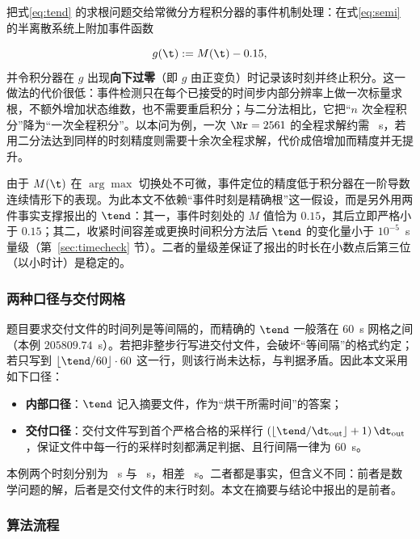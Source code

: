 把式\eqref{eq:tend} 的求根问题交给常微分方程积分器的事件机制处理：在式\eqref{eq:semi} 的半离散系统上附加事件函数

\begin{equation}
g(\t):=M(\t)-0.15,
\label{eq:event}
\end{equation}
并令积分器在 $g$ 出现\textbf{向下过零}（即 $g$ 由正变负）时记录该时刻并终止积分。这一做法的代价很低：事件检测只在每个已接受的时间步内部分辨率上做一次标量求根，不额外增加状态维数，也不需要重启积分；与二分法相比，它把``$n$ 次全程积分''降为``一次全程积分''。以本问为例，一次 $\Nr=2561$ 的全程求解约需 \QThreeWallS~s，若用二分法达到同样的时刻精度则需要十余次全程求解，代价成倍增加而精度并无提升。

由于 $M(\t)$ 在 $\arg\max$ 切换处不可微，事件定位的精度低于积分器在一阶导数连续情形下的表现。为此本文不依赖``事件时刻是精确根''这一假设，而是另外用两件事实支撑报出的 $\tend$：其一，事件时刻处的 $M$ 值恰为 $0.15$，其后立即严格小于 $0.15$；其二，收紧时间容差或更换时间积分方法后 $\tend$ 的变化量小于 $10^{-5}$~s 量级（第~\ref{sec:timecheck} 节）。二者的量级差保证了报出的时长在小数点后第三位（以小时计）是稳定的。

\subsubsection{两种口径与交付网格}

题目要求交付文件的时间列是等间隔的，而精确的 $\tend$ 一般落在 $60$~s 网格之间（本例 $205809.74$~s）。若把非整步行写进交付文件，会破坏``等间隔''的格式约定；若只写到 $\lfloor\tend/60\rfloor\cdot60$ 这一行，则该行尚未达标，与判据矛盾。因此本文采用如下口径：

\begin{itemize}
  \item \textbf{内部口径}：$\tend$ 记入摘要文件，作为``烘干所需时间''的答案；
  \item \textbf{交付口径}：交付文件写到首个严格合格的采样行 $\left(\lfloor\tend/\dt_{\mathrm{out}}\rfloor+1\right)\dt_{\mathrm{out}}$，保证文件中每一行的采样时刻都满足判据、且行间隔一律为 $60$~s。
\end{itemize}

本例两个时刻分别为 \QThreeEventS~s 与 \QThreeLastRowS~s，相差 \QThreeGap~s。二者都是事实，但含义不同：前者是数学问题的解，后者是交付文件的末行时刻。本文在摘要与结论中报出的是前者。

\subsubsection{算法流程}

